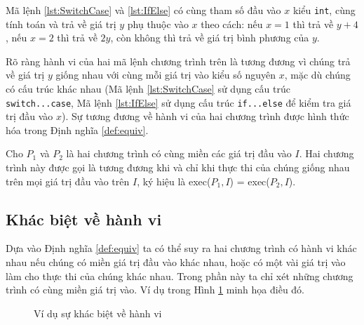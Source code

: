 \begin{minipage}[t]{0.45\linewidth}
  
\end{minipage}%
\hfill\vrule\hfill
\begin{minipage}[t]{0.45\linewidth}
  
\end{minipage}%

Mã lệnh \ref{lst:SwitchCase} và \ref{lst:IfElse} có cùng tham số đầu vào
$ x $ kiểu \texttt{int}, cùng tính toán và trả về giá trị
$ y $ phụ thuộc vào $ x $ theo cách: nếu $ x = 1 $ thì
trả về $ y + 4 $, nếu $ x = 2 $ thì trả về $ 2y $, còn
không thì trả về giá trị bình phương của $ y $.

Rõ ràng hành vi của hai mã lệnh chương trình trên là tương đương vì
chúng trả về giá trị $ y $ giống nhau với cùng mỗi giá trị vào
kiểu số nguyên $ x $, mặc dù chúng có cấu trúc khác nhau (Mã lệnh
\ref{lst:SwitchCase} sử dụng cấu trúc \texttt{switch...case}, Mã lệnh
\ref{lst:IfElse} sử dụng cấu trúc \texttt{if...else} để kiểm tra giá
trị đầu vào $x$). Sự tương đương về hành vi của hai chương trình được
hình thức hóa trong Định nghĩa \ref{def:equiv}.

\begin{definition}
  \label{def:equiv}
  Cho $P_{1}$ và $P_{2}$ là hai chương trình có cùng miền các giá trị
  đầu vào $I$. Hai chương trình này được gọi là tương đương khi và chỉ
  khi thực thi của chúng giống nhau trên mọi giá trị đầu vào trên $I$,
  ký hiệu là exec($P_{1}, I$) = exec($P_{2}, I$).
\end{definition}
	
\subsection{Khác biệt về hành vi}

Dựa vào Định nghĩa \ref{def:equiv} ta có thể suy ra hai chương trình
có hành vi khác nhau nếu chúng có miền giá trị đầu vào khác nhau, hoặc
có một vài giá trị vào làm cho thực thi của chúng khác nhau. Trong
phần này ta chỉ xét những chương trình có cùng miền giá trị vào. Ví dụ trong Hình \ref{fig:behavioral-diff} minh họa điều đó.

\begin{figure}[h]
  \centering
  \caption{Ví dụ sự khác biệt về hành vi}
  \label{fig:behavioral-diff}
  \begin{minipage}[t]{0.45\linewidth}
    
  \end{minipage}%
\hfill\vrule\hfill
\begin{minipage}[t]{0.45\linewidth}
  
\end{minipage}%
\end{figure}

